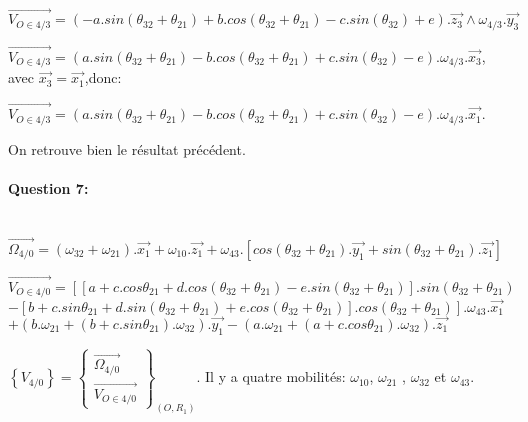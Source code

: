 $\overrightarrow{V_{O\in4/3}}=(-a.sin(\theta_{32}+\theta_{21})+b.cos(\theta_{32}+\theta_{21})-c.sin(\theta_{32})+e).\overrightarrow{z_3}\wedge\omega_{4/3}.\overrightarrow{y_3}$

$\overrightarrow{V_{O\in4/3}}=(a.sin(\theta_{32}+\theta_{21})-b.cos(\theta_{32}+\theta_{21})+c.sin(\theta_{32})-e).\omega_{4/3}.\overrightarrow{x_3}$, avec $\overrightarrow{x_3}=\overrightarrow{x_1}$,donc:

$\overrightarrow{V_{O\in4/3}}=(a.sin(\theta_{32}+\theta_{21})-b.cos(\theta_{32}+\theta_{21})+c.sin(\theta_{32})-e).\omega_{4/3}.\overrightarrow{x_1}$.

On retrouve bien le résultat précédent.



\paragraph{Question 7:} ~\ \\

$\overrightarrow{\Omega_{4/0}}=(\omega_{32}+\omega_{21}).\overrightarrow{x_1}+\omega_{10}.\overrightarrow{z_1}+\omega_{43}.\left[cos(\theta_{32}+\theta_{21}).\overrightarrow{y_1}+sin(\theta_{32}+\theta_{21}).\overrightarrow{z_1}\right]$

$\overrightarrow{V_{O\in4/0}}=\left[\left[a+c.cos \theta_{21}+d.cos (\theta_{32}+\theta_{21})-e.sin (\theta_{32}+\theta_{21})\right].sin (\theta_{32}+\theta_{21})\right.$\\$\left.-\left[b+c.sin \theta_{21}+d.sin (\theta_{32}+\theta_{21})+e.cos (\theta_{32}+\theta_{21})\right].cos (\theta_{32}+\theta_{21})\right].\omega_{43}.\overrightarrow{x_1}$\\$+(b.\omega_{21}+(b+c.sin\theta_{21}).\omega_{32}).\overrightarrow{y_1}-(a.\omega_{21}+(a+c.cos\theta_{21}).\omega_{32}).\overrightarrow{z_1}$

$\left\{V_{4/0}\right\}=\left\{\begin{array}{c} 
\overrightarrow{\Omega_{4/0}} \\
\overrightarrow{V_{O\in4/0}}
\end{array} \right\}_{(O,R_1)}$. Il y a quatre mobilités: $\omega_{10}$, $\omega_{21}$ , $\omega_{32}$ et $\omega_{43}$.


